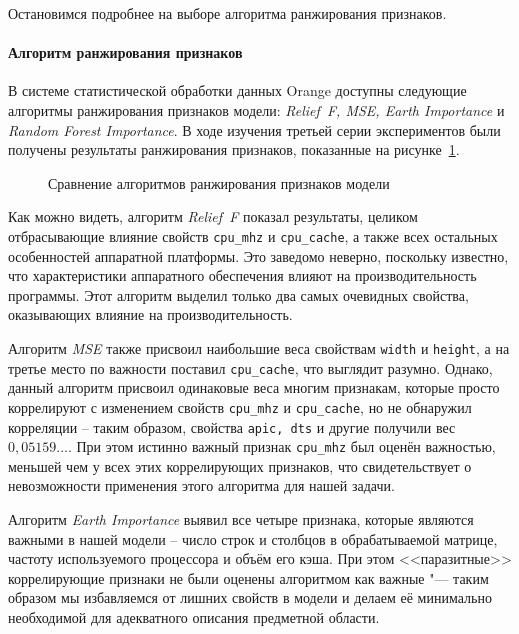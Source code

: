 Остановимся подробнее на выборе алгоритма ранжирования признаков.

\paragraph{Алгоритм ранжирования признаков}
\label{choice-of-feature-ranking-algorithm}

В системе статистической обработки данных Orange доступны следующие алгоритмы ранжирования признаков модели: \textit{Relief~F, MSE, Earth Importance} и \textit{Random Forest Importance}. В ходе изучения третьей серии экспериментов были получены результаты ранжирования признаков, показанные на рисунке~\ref{img:ranking-full}.

\begin{figure}
    \caption{Сравнение алгоритмов ранжирования признаков модели}
    \label{img:ranking-full}
\end{figure}

Как можно видеть, алгоритм \textit{Relief~F} показал результаты, целиком отбрасывающие влияние свойств \texttt{cpu\_mhz} и \texttt{cpu\_cache}, а также всех остальных особенностей аппаратной платформы. Это заведомо неверно, поскольку известно, что характеристики аппаратного обеспечения влияют на производительность программы. Этот алгоритм выделил только два самых очевидных свойства, оказывающих влияние на производительность.

Алгоритм \textit{MSE} также присвоил наибольшие веса свойствам \texttt{width} и \texttt{height}, а на третье место по важности поставил \texttt{cpu\_cache}, что выглядит разумно. Однако, данный алгоритм присвоил одинаковые веса многим признакам, которые просто коррелируют с изменением свойств \texttt{cpu\_mhz} и \texttt{cpu\_cache}, но не обнаружил корреляции -- таким образом, свойства \texttt{apic, dts} и другие получили вес $0,05159...$. При этом истинно важный признак \texttt{cpu\_mhz} был оценён важностью, меньшей чем у всех этих коррелирующих признаков, что свидетельствует о невозможности применения этого алгоритма для нашей задачи.

Алгоритм \textit{Earth Importance} выявил все четыре признака, которые являются важными в нашей модели -- число строк и столбцов в обрабатываемой матрице, частоту используемого процессора и объём его кэша. При этом <<паразитные>> коррелирующие признаки не были оценены алгоритмом как важные "--- таким образом мы избавляемся от лишних свойств в модели и делаем её минимально необходимой для адекватного описания предметной области.


